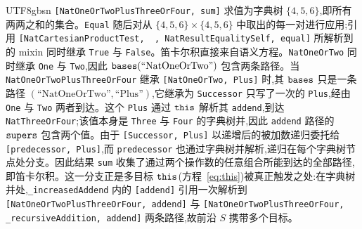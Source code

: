 \begin{CJK*}{UTF8}{gbsn}
\ifPaperChinese
\texttt{[NatOneOrTwoPlusThreeOrFour, sum]} 求值为字典树 $\{4,5,6\}$,即所有两两之和的集合。\texttt{Equal} 随后对从 $\{4,5,6\} \times \{4,5,6\}$ 中取出的每一对进行应用;引用 \texttt{[NatCartesianProductTest, ~, NatResultEqualitySelf, equal]} 所解析到的 mixin 同时继承 \texttt{True} 与 \texttt{False}。笛卡尔积直接来自语义方程。\texttt{NatOneOrTwo} 同时继承 \texttt{One} 与 \texttt{Two},因此 $\mathtt{bases}(\text{``NatOneOrTwo''})$ 包含两条路径。当 \texttt{NatOneOrTwoPlusThreeOrFour} 继承 \texttt{[NatOneOrTwo, Plus]} 时,其 $\mathtt{bases}$ 只是一条路径 $(\text{``NatOneOrTwo''}, \text{``Plus''})$,它继承为 \texttt{Successor} 只写了一次的 \texttt{Plus},经由 \texttt{One} 与 \texttt{Two} 两者到达。这个 \texttt{Plus} 通过 $\mathtt{this}$ 解析其 \texttt{addend},到达 \texttt{NatThreeOrFour};该值本身是 \texttt{Three} 与 \texttt{Four} 的字典树并,因此 \texttt{addend} 路径的 $\mathtt{supers}$ 包含两个值。由于 \texttt{[Successor, Plus]} 以递增后的被加数递归委托给 \texttt{[predecessor, Plus]},而 \texttt{predecessor} 也通过字典树并解析,递归在每个字典树节点处分支。因此结果 \texttt{sum} 收集了通过两个操作数的任意组合所能到达的全部路径,即笛卡尔积。这一分支正是多目标 $\mathtt{this}$(方程~\ref{eq:this})被真正触发之处:在字典树并处,\texttt{_increasedAddend} 内的 \texttt{[addend]} 引用一次解析到 \texttt{[NatOneOrTwoPlusThreeOrFour, addend]} 与 \texttt{[NatOneOrTwoPlusThreeOrFour, _recursiveAddition, addend]} 两条路径,故前沿 $S$ 携带多个目标。


\end{CJK*}
